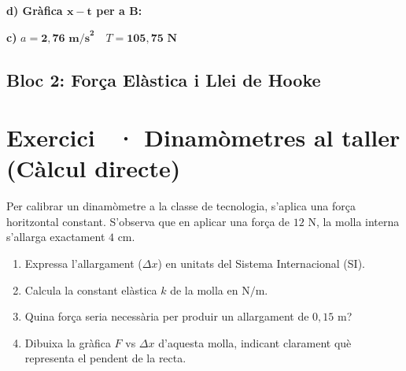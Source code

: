 \documentclass[12pt,a4paper,twoside]{article}
\newcounter{exercici}
\newcommand{\exercici}[1]{%
  \stepcounter{exercici}
  \section*{Exercici \theexercici\ \textnormal{· #1}}
  \vspace{-10pt}
}
\begin{document}
{\textbf{d) Gràfica $\mathbf{x-t}$ per a B:}
\begin{center}
\end{center}

\begin{tcolorbox}[title=Respostes Finals,colframe=red!70!black,colback=red!5,sharp corners=south,fontupper=\color{blue}]
\textbf{c)} $a = \mathbf{2{,}76\text{ m/s}^2} \quad T = \mathbf{105{,}75\text{ N}}$
\end{tcolorbox}
}

\clearpage
\subsection*{Bloc 2: Força Elàstica i Llei de Hooke}

\exercici{Dinamòmetres al taller (Càlcul directe)}
Per calibrar un dinamòmetre a la classe de tecnologia, s'aplica una força horitzontal constant. S'observa que en aplicar una força de $12\text{ N}$, la molla interna s'allarga exactament $4\text{ cm}$.
\begin{enumerate}[label=\textbf{\alph*)}]
  \item Expressa l'allargament ($\Delta x$) en unitats del Sistema Internacional (SI).
  \item Calcula la constant elàstica $k$ de la molla en $\text{N/m}$.
  \item Quina força seria necessària per produir un allargament de $0{,}15\text{ m}$?
  \item Dibuixa la gràfica $F$ vs $\Delta x$ d'aquesta molla, indicant clarament què representa el pendent de la recta.
\end{enumerate}
\end{document}
